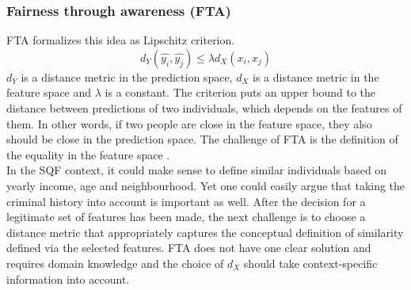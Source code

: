 \subsubsection*{Fairness through awareness (FTA)}
FTA formalizes this idea as Lipschitz criterion. $$d_Y(\hat{y_i}, \hat{y_j}) \leq \lambda {d_X}(x_i, x_j)$$
$d_Y$ is a distance metric in the prediction space, $d_X$ is a distance metric in the feature space and $\lambda$ is a constant.
The criterion puts an upper bound to the distance between predictions of two individuals, which depends on the features of them. In other words, if two people are close in the feature space, they also should be close in the prediction space. The challenge of FTA is the definition of the equality in the feature space \cite{castelnovo2022}.\\
In the SQF context, it could make sense to define similar individuals based on yearly income, age and neighbourhood.
Yet one could easily argue that taking the criminal history into account is important as well. After the decision for a legitimate set of features has been made, the next challenge is to choose a distance metric that appropriately captures the conceptual definition of similarity defined via the selected features.
FTA does not have one clear solution and requires domain knowledge and the choice of $d_X$ should take context-specific information into account.

